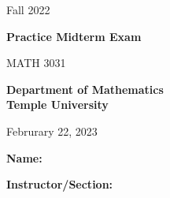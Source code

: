 \documentclass[12pt]{report}
\begin{document}
\begin{center}
\large{Fall 2022}
\end{center}

\vspace{20pt}

\begin{center}
\huge{\textbf{Practice Midterm Exam}}
\end{center}

\begin{center}
\Large{MATH 3031}
\end{center}

\begin{center}
\large{\textbf{Department of Mathematics \\ Temple University}}
\end{center}

\vspace{30pt}

\begin{center}
\large{Februrary 22, 2023}
\end{center}

\vspace{10pt}

\begin{center}
\large{\textbf{Name:} \hrulefill}
\end{center}

\begin{center}
\large{\textbf{Instructor/Section:} \hrulefill}
\end{center}




\vspace{30pt}
\end{document}
